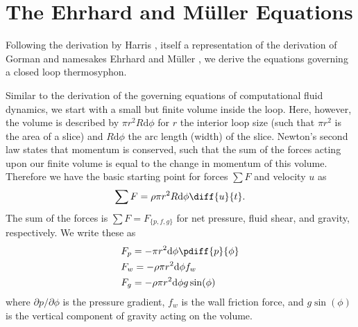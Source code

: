 \clearpage
\pagebreak
\section{The Ehrhard and M\"{u}ller Equations}

Following the derivation by Harris \cite{harris2011predicting}, itself a representation of the derivation of Gorman \cite{gorman1986} and namesakes Ehrhard and M\"{u}ller \cite{ehrhard1990dynamical}, we derive the equations governing a closed loop thermosyphon.

Similar to the derivation of the governing equations of computational fluid dynamics, we start with a small but finite volume inside the loop.
Here, however, the volume is described by $\pi r^2 R \text{d} \phi$ for $r$ the interior loop size (such that $\pi r^2$ is the area of a slice) and $R\text{d}\phi$ the arc length (width) of the slice.
Newton's second law states that momentum is conserved, such that the sum of the forces acting upon our finite volume is equal to the change in momentum of this volume.
Therefore we have the basic starting point for forces $\sum F$ and velocity $u$ as
\begin{equation} \sum F = \rho \pi r^2 R \text{d}\phi \diff{u}{t} .\end{equation}
The sum of the forces is $\sum F = F_{\{p,f,g\}}$ for net pressure, fluid shear, and gravity, respectively.
We write these as
\begin{align} & F_p = -\pi r^2 \text{d} \phi \pdiff{p}{\phi}\\
& F_w = -\rho \pi r^2 \text{d} \phi f_w\\
& F_g = -\rho \pi r^2 \text{d} \phi g \sin (\phi)\end{align}
where $\partial p /\partial \phi$ is the pressure gradient, $f_w$ is the wall friction force, and $g \sin (\phi)$ is the vertical component of gravity acting on the volume.

